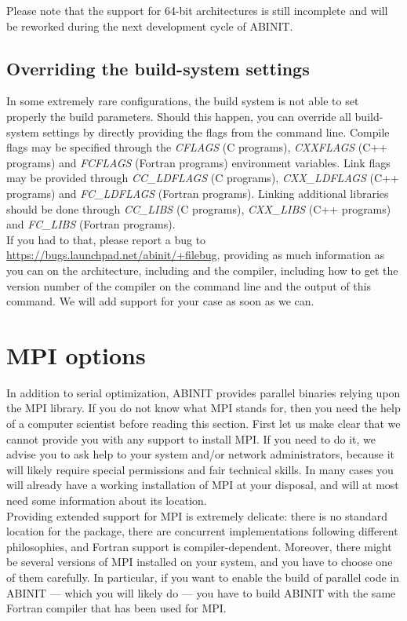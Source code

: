 Please note that the support for 64-bit architectures is still incomplete
and will be reworked during the next development cycle of ABINIT.


\subsection{Overriding the build-system settings}

In some extremely rare configurations, the build system is not able
to set properly the build parameters. Should this happen, you can
override all build-system settings by directly providing the flags
from the command line. Compile flags may be specified through the
\textit{CFLAGS} (C programs), \textit{CXXFLAGS} (C++ programs) and
\textit{FCFLAGS} (Fortran programs) environment variables. Link flags
may be provided through \textit{CC\_LDFLAGS} (C programs), \textit{CXX\_LDFLAGS}
(C++ programs) and \textit{FC\_LDFLAGS} (Fortran programs). Linking
additional libraries should be done through \textit{CC\_LIBS} (C programs),
\textit{CXX\_LIBS} (C++ programs) and \textit{FC\_LIBS} (Fortran programs).\\


If you had to that, please report a bug to \href{https://bugs.launchpad.net/abinit/+filebug}{https://bugs.launchpad.net/abinit/+filebug},
providing as much information as you can on the architecture, including
and the compiler, including how to get the version number of the compiler
on the command line and the output of this command. We will add support
for your case as soon as we can.


\section{MPI options}

In addition to serial optimization, ABINIT provides parallel binaries
relying upon the MPI library. If you do not know what MPI stands for,
then you  need the help of a computer scientist before
reading this section. First let us make clear that we cannot provide
you with any support to install MPI. If you need to do it, we advise
you to ask help to your system and/or network administrators, because
it will likely require special permissions and fair technical skills.
In many cases you will already have a working installation of MPI
at your disposal, and will at most need some information about its
location.\\


Providing extended support for MPI is extremely delicate: there is
no standard location for the package, there are concurrent implementations
following different philosophies, and Fortran support is compiler-dependent.
Moreover, there might be several versions of MPI installed on your
system, and you have to choose one of them carefully. In particular,
if you want to enable the build of parallel code in ABINIT --- which
you will likely do --- you have to build ABINIT with the same Fortran
compiler that has been used for MPI.\\


